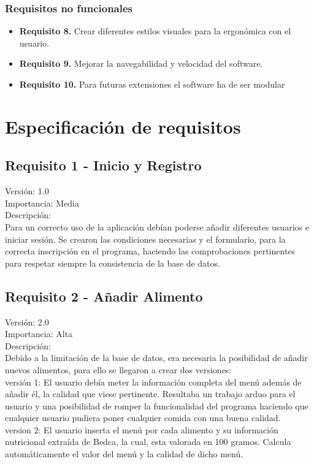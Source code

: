\subsubsection{Requisitos no funcionales}
\begin{itemize}
\item \textbf{Requisito 8.} Crear diferentes estilos visuales para la ergonómica con el usuario.
\item \textbf{Requisito 9.} Mejorar la navegabilidad y velocidad del software.
\item \textbf{Requisito 10.} Para futuras extensiones el software ha de ser modular
\end{itemize}
\section{Especificación de requisitos}
\subsection{Requisito 1 - Inicio y Registro}
Versión: 1.0\\
Importancia: Media\\
Descripción:\\
Para un correcto uso de la aplicación debían poderse añadir diferentes usuarios e iniciar sesión. Se crearon las condiciones necesarias y el formulario, para la correcta inscripción en el programa, haciendo las comprobaciones pertinentes para respetar siempre la consistencia de la base de datos.

\subsection{Requisito 2 - Añadir Alimento}
Versión: 2.0\\
Importancia: Alta\\
Descripción:\\
Debido a la limitación de la base de datos, era necesaria la posibilidad de añadir nuevos alimentos, para ello se llegaron a crear dos versiones:\\
versión 1: El usuario debía meter la información completa del menú además de añadir él, la calidad que viese pertinente. Resultaba un trabajo arduo para el usuario y una posibilidad de romper la funcionalidad del programa haciendo que cualquier usuario pudiera poner cualquier comida con una buena calidad.\\
version 2: El usuario inserta el menú por cada alimento  y su información nutricional extraída de Bedca, la cual, esta valorada en 100 gramos. Calcula automáticamente el valor del menú y la calidad de dicho menú.
